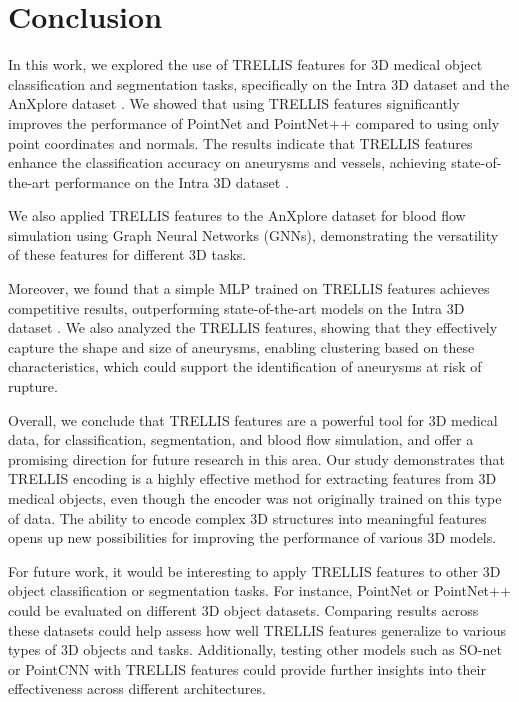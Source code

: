\documentclass[%
 reprint,
 amsmath,amssymb,
 aps,
 floatfix,
 nofootinbib,
]{revtex4-2}
\begin{document}
\section{Conclusion} \label{CONCLUSION}
In this work, we explored the use of TRELLIS \citep{xiang2024structured} features for 3D medical object classification and segmentation tasks, specifically on the Intra 3D dataset \citep{yang2020intra} and the AnXplore dataset \citep{anxplore}. We showed that using TRELLIS features significantly improves the performance of PointNet \citep{pointnet} and PointNet++ \citep{pointnetpp} compared to using only point coordinates and normals. The results indicate that TRELLIS features enhance the classification accuracy on aneurysms and vessels, achieving state-of-the-art performance on the Intra 3D dataset \citep{yang2020intra}.

We also applied TRELLIS features to the AnXplore dataset \citep{anxplore} for blood flow simulation using Graph Neural Networks (GNNs), demonstrating the versatility of these features for different 3D tasks.

Moreover, we found that a simple MLP trained on TRELLIS features achieves competitive results, outperforming state-of-the-art models on the Intra 3D dataset \citep{yang2020intra}. We also analyzed the TRELLIS features, showing that they effectively capture the shape and size of aneurysms, enabling clustering based on these characteristics, which could support the identification of aneurysms at risk of rupture.

Overall, we conclude that TRELLIS features are a powerful tool for 3D medical data, for classification, segmentation, and blood flow simulation, and offer a promising direction for future research in this area. Our study demonstrates that TRELLIS encoding is a highly effective method for extracting features from 3D medical objects, even though the encoder was not originally trained on this type of data. The ability to encode complex 3D structures into meaningful features opens up new possibilities for improving the performance of various 3D models.

For future work, it would be interesting to apply TRELLIS features to other 3D object classification or segmentation tasks. For instance, PointNet or PointNet++ could be evaluated on different 3D object datasets. Comparing results across these datasets could help assess how well TRELLIS features generalize to various types of 3D objects and tasks. Additionally, testing other models such as SO-net \citep{sonet} or PointCNN \citep{pointcnn} with TRELLIS features could provide further insights into their effectiveness across different architectures.
\end{document}
